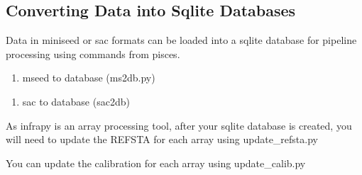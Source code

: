 \documentclass[letterpaper,10pt,english]{sphinxmanual}
\begin{document}
\subsection{Converting Data into Sqlite Databases}
\label{\detokenize{pisces:converting-data-into-sqlite-databases}}
Data in miniseed or sac formats can be loaded into a sqlite database for pipeline processing using commands from pisces.
\begin{enumerate}
%
\item {} 
mseed to database (ms2db.py)

\end{enumerate}

\begin{sphinxVerbatim}[commandchars=\\\{\}]
   
\end{sphinxVerbatim}
\begin{enumerate}
%
\setcounter{enumi}{1}
\item {} 
sac to database (sac2db)

\end{enumerate}

\begin{sphinxVerbatim}[commandchars=\\\{\}]
    
\end{sphinxVerbatim}

As infrapy is an array processing tool, after your sqlite database is created, you will need to update the REFSTA for each array using update\_refsta.py

\begin{sphinxVerbatim}[commandchars=\\\{\}]
    
\end{sphinxVerbatim}

You can update the calibration for each array using update\_calib.py
\end{document}
